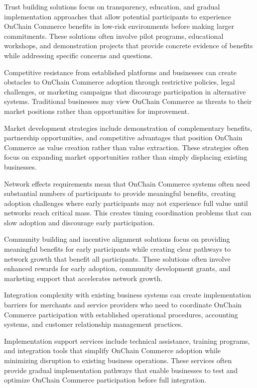 \documentclass[
  Letterpaper,
]{scrbook}
\begin{document}
Trust building solutions focus on transparency, education, and gradual
implementation approaches that allow potential participants to
experience OnChain Commerce benefits in low-risk environments before
making larger commitments. These solutions often involve pilot programs,
educational workshops, and demonstration projects that provide concrete
evidence of benefits while addressing specific concerns and questions.

Competitive resistance from established platforms and businesses can
create obstacles to OnChain Commerce adoption through restrictive
policies, legal challenges, or marketing campaigns that discourage
participation in alternative systems. Traditional businesses may view
OnChain Commerce as threats to their market positions rather than
opportunities for improvement.

Market development strategies include demonstration of complementary
benefits, partnership opportunities, and competitive advantages that
position OnChain Commerce as value creation rather than value
extraction. These strategies often focus on expanding market
opportunities rather than simply displacing existing businesses.

Network effects requirements mean that OnChain Commerce systems often
need substantial numbers of participants to provide meaningful benefits,
creating adoption challenges where early participants may not experience
full value until networks reach critical mass. This creates timing
coordination problems that can slow adoption and discourage early
participation.

Community building and incentive alignment solutions focus on providing
meaningful benefits for early participants while creating clear pathways
to network growth that benefit all participants. These solutions often
involve enhanced rewards for early adoption, community development
grants, and marketing support that accelerates network growth.

Integration complexity with existing business systems can create
implementation barriers for merchants and service providers who need to
coordinate OnChain Commerce participation with established operational
procedures, accounting systems, and customer relationship management
practices.

Implementation support services include technical assistance, training
programs, and integration tools that simplify OnChain Commerce adoption
while minimizing disruption to existing business operations. These
services often provide gradual implementation pathways that enable
businesses to test and optimize OnChain Commerce participation before
full integration.
\end{document}
